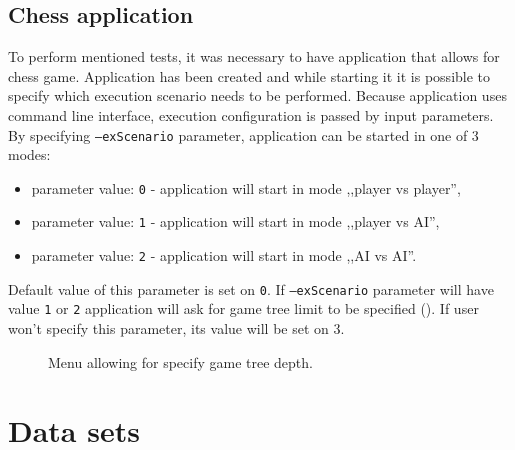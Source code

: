 \subsection{Chess application}
To perform mentioned tests, it was necessary to have application that allows for chess game. Application has been created and while starting it it is possible to specify which execution scenario needs to be performed. Because application uses command line interface, execution configuration is passed by input parameters. By specifying \texttt{--exScenario} parameter, application can be started in one of 3 modes:
\begin{itemize}
    \item parameter value: \texttt{0} - application will start in mode ,,player vs player'',
    \item parameter value: \texttt{1} - application will start in mode ,,player vs AI'',
    \item parameter value: \texttt{2} - application will start in mode ,,AI vs AI''.
\end{itemize}
Default value of this parameter is set on \texttt{0}. If \texttt{--exScenario} parameter will have value \texttt{1} or \texttt{2} application will ask for game tree limit to be specified (). If user won't specify this parameter, its value will be set on $3$.
\begin{figure}
    \centering
    \caption{Menu allowing for specify game tree depth.}
    \label{fig:setting-game-tree-depth}
\end{figure}

\section{Data sets}\label{sec:data-sets}

